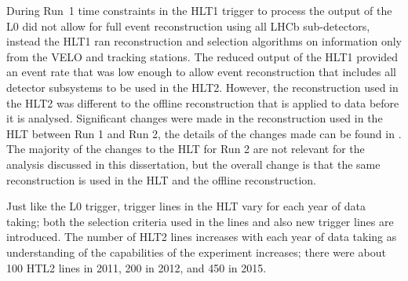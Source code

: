 During Run~1 time constraints in the HLT1 trigger to process the output of the L0 did not allow for full event reconstruction using all LHCb sub-detectors, instead the HLT1 ran reconstruction and selection algorithms on information only from the VELO and tracking stations. The reduced output of the HLT1 provided an event rate that was low enough to allow event reconstruction that includes all detector subsystems to be used in the HLT2. However, the reconstruction used in the HLT2 was different to the offline reconstruction that is applied to data before it is analysed. Significant changes were made in the reconstruction used in the HLT between Run 1 and Run 2, the details of the changes made can be found in \cite{Lupton:2230910}. The majority of the changes to the HLT for Run 2 are not relevant for the analysis discussed in this dissertation, but the overall change is that the same reconstruction is used in the HLT and the offline reconstruction. 


Just like the L0 trigger, trigger lines in the HLT vary for each year of data taking; both the selection criteria used in the lines and also new trigger lines are introduced. The number of HLT2 lines increases with each year of data taking as understanding of the capabilities of the experiment increases; there were about 100 HTL2 lines in 2011, 200 in 2012, and 450 in 2015. 

